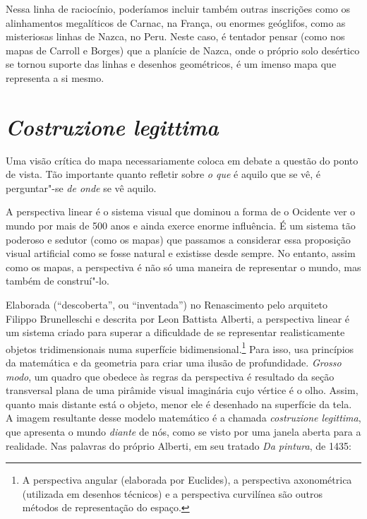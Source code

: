 Nessa linha de raciocínio, poderíamos incluir também outras inscrições
como os alinhamentos megalíticos de Carnac, na França, ou enormes
geóglifos, como as misteriosas linhas de Nazca, no Peru. Neste caso, é
tentador pensar (como nos mapas de Carroll e Borges) que a planície de
Nazca, onde o próprio solo desértico se tornou suporte das linhas e
desenhos geométricos, é um imenso mapa que representa a si mesmo.

\chapter{\emph{Costruzione legittima}}

Uma visão crítica do mapa necessariamente coloca em debate a questão do
ponto de vista. Tão importante quanto refletir sobre \emph{o que} é
aquilo que se vê, é perguntar"-se \emph{de onde} se vê aquilo.

A perspectiva linear é o sistema visual que dominou a forma de o \label{perspectiva}
Ocidente ver o mundo por mais de 500 anos e ainda exerce enorme
influência. É um sistema tão poderoso e sedutor (como os mapas) que
passamos a considerar essa proposição visual artificial como se fosse
natural e existisse desde sempre. No entanto, assim como os mapas, a
perspectiva é não só uma maneira de representar o mundo, mas também de
construí"-lo.

Elaborada (``descoberta'', ou ``inventada'') no Renascimento pelo
arquiteto Filippo Brunelleschi e descrita por Leon Battista Alberti, a
perspectiva linear é um sistema criado para superar a dificuldade de se
representar realisticamente objetos tridimensionais numa superfície
bidimensional.\footnote{A perspectiva angular (elaborada por Euclides), a perspectiva axonométrica (utilizada em desenhos técnicos) e a perspectiva curvilínea são outros métodos de representação do espaço.} Para isso, usa princípios da matemática e da geometria
para criar uma ilusão de profundidade. \emph{Grosso modo}, um quadro que
obedece às regras da perspectiva é resultado da seção transversal plana
de uma pirâmide visual imaginária cujo vértice é o olho. Assim, quanto
mais distante está o objeto, menor ele é desenhado na superfície da
tela. A imagem resultante desse modelo matemático é a chamada
\emph{costruzione legittima}, que apresenta o mundo \emph{diante} de
nós, como se visto por uma janela aberta para a realidade. Nas palavras
do próprio Alberti, em seu tratado \emph{Da pintura}, de 1435:

